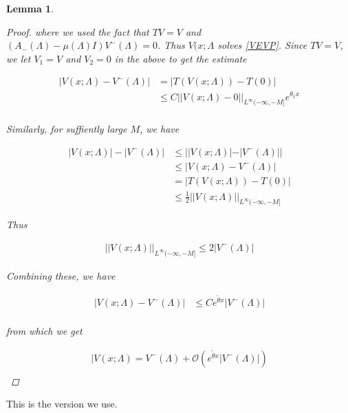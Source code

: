 \documentclass[12pt]{article}
\newtheorem{lemma}{Lemma}
\begin{document}
\begin{lemma}
\begin{proof}
where we used the fact that $TV = V$ and $(A_-(\Lambda) - \mu(\Lambda)I)V^-(\Lambda) = 0$. Thus $V(x; \Lambda$ solves \eqref{VEVP}. Since $TV = V$, we let $V_1 = V$ and $V_2 = 0$ in the above to get the estimate

\begin{align*}
|V(x; \Lambda) - V^-(\Lambda)| &= |T(V(x; \Lambda)) - T(0)| \\
&\leq C ||V(x; \Lambda) - 0||_{L^\infty(-\infty, -M]} e^{\theta_1 x} \\
\end{align*}

Similarly, for suffiently large $M$, we have

\begin{align*}
|V(x; \Lambda)| - |V^-(\Lambda)| &\leq | |V(x; \Lambda)| - |V^-(\Lambda)| | \\
&\leq |V(x; \Lambda) - V^-(\Lambda)| \\
&= |T(V(x; \Lambda)) - T(0)| \\
&\leq \frac{1}{2} ||V(x; \Lambda)||_{L^\infty(-\infty, -M]}
\end{align*}

Thus

\begin{align*}
||V(x; \Lambda)||_{L^\infty(-\infty, -M]} \leq 2 |V^-(\Lambda)|
\end{align*}

Combining these, we have

\begin{align*}
|V(x; \Lambda) - V^-(\Lambda)| &\leq C e^{\tilde{\theta} x}|V^-(\Lambda)| \\
\end{align*}

from which we get

\begin{align*}
|V(x; \Lambda) = V^-(\Lambda) + \mathcal{O}( e^{\tilde{\theta} x}|V^-(\Lambda)| )\\
\end{align*}

\end{proof}
\end{lemma}


This is the version we use.
\end{document}

